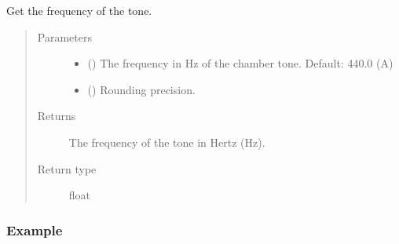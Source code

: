 \documentclass[letterpaper,10pt,english]{sphinxmanual}
\begin{document}
\begin{fulllineitems}
\begin{fulllineitems}
\begin{sphinxVerbatim}[commandchars=\\\{\}]
   
\end{sphinxVerbatim}

\end{fulllineitems}


\begin{fulllineitems}
\label{\detokenize{api:musictheory.Tone.get_frequency}}
Get the frequency of the tone.
\begin{quote}\begin{description}
\item[{Parameters}] \leavevmode\begin{itemize}
\item {} 
 () \textendash{} The frequency in Hz of the chamber tone. Default: 440.0 (A)

\item {} 
 () \textendash{} Rounding precision.

\end{itemize}

\item[{Returns}] \leavevmode
The frequency of the tone in Hertz (Hz).

\item[{Return type}] \leavevmode
float

\end{description}\end{quote}
\subsubsection*{Example}


\end{fulllineitems}
\end{fulllineitems}
\end{document}
